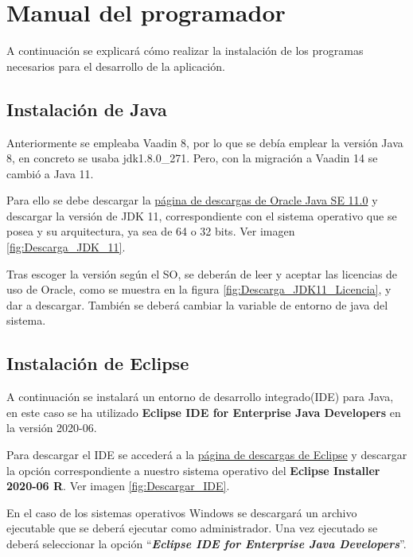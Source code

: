 \section{Manual del programador}
A continuación se explicará cómo realizar la instalación de los programas necesarios para el desarrollo de la aplicación.

\subsection{Instalación de Java}

Anteriormente se empleaba Vaadin 8, por lo que se debía emplear la versión Java 8, en concreto se usaba jdk1.8.0\_271. Pero, con la migración a Vaadin 14 se cambió a Java 11.
 
Para ello se debe descargar la \href{https://www.oracle.com/es/java/technologies/javase/jdk11-archive-downloads.html}{página de descargas de Oracle Java SE 11.0} y descargar la versión de JDK 11, correspondiente con el sistema operativo que se posea y su arquitectura, ya sea de 64 o 32 bits. Ver imagen \ref{fig:Descarga_JDK_11}.

Tras escoger la versión según el SO, se deberán de leer y aceptar las licencias de uso de Oracle, como se muestra en la figura \ref{fig:Descarga_JDK11_Licencia}, y dar a descargar. También se deberá cambiar la variable de entorno de java del sistema.


\subsection{Instalación de Eclipse}
A continuación se instalará un entorno de desarrollo integrado(IDE) para Java, en este caso se ha utilizado \textbf{Eclipse IDE for Enterprise Java Developers} en la versión 2020-06. 

Para descargar el IDE se accederá a la \href{https://www.eclipse.org/downloads/packages/release/2020-06/r}{página de descargas de Eclipse} y descargar la opción correspondiente a nuestro sistema operativo del \textbf{Eclipse Installer 2020-06 R}. Ver imagen \ref{fig:Descargar_IDE}.


En el caso de los sistemas operativos Windows se descargará un archivo ejecutable que se deberá ejecutar como administrador. Una vez ejecutado se deberá seleccionar la opción ``\textbf{\textit{Eclipse IDE for Enterprise Java Developers}}''. 

